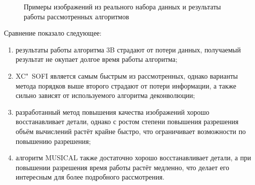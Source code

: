 \begin{figure}[ht]
	\caption{Примеры изображений из реального набора данных и результаты работы рассмотренных алгоритмов}
	\label{fig:blinking-results-real}
\end{figure}

Сравнение показало следующее:

\begin{enumerate}
	\item результаты работы алгоритма 3B страдают от потери данных, получаемый результат не окупает долгое время работы алгоритма;
	\item XC"~SOFI является самым быстрым из рассмотренных, однако варианты метода порядков выше второго страдают от потери информации, а также сильно зависят от используемого алгоритма деконволюции;
	\item разработанный метод повышения качества изображений хорошо восстанавливает детали, однако с ростом степени повышения разрешения объём вычислений растёт крайне быстро, что ограничивает возможности по повышению разрешения;
	\item алгоритм MUSICAL также достаточно хорошо восстанавливает детали, а при повышении разрешения время работы растёт медленно, что делает его интересным для более подробного рассмотрения.
\end{enumerate}

